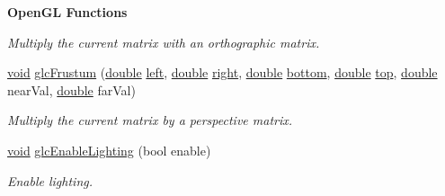 \begin{Indent}{\bf Open\-G\-L Functions}
\begin{DoxyCompactItemize}
\begin{DoxyCompactList}\small\item\em Multiply the current matrix with an orthographic matrix. \end{DoxyCompactList}\item 
\hyperlink{group___u_a_v_objects_plugin_ga444cf2ff3f0ecbe028adce838d373f5c}{void} \hyperlink{class_g_l_c___context_a8076a77848e9e2dbf734466c09b665fe}{glc\-Frustum} (\hyperlink{_super_l_u_support_8h_a8956b2b9f49bf918deed98379d159ca7}{double} \hyperlink{glext_8h_a85b8f6c07fbc1fb5d77c2ae090f21995}{left}, \hyperlink{_super_l_u_support_8h_a8956b2b9f49bf918deed98379d159ca7}{double} \hyperlink{glext_8h_a5ffadbbacc6b89cf6218bc43b384d3fe}{right}, \hyperlink{_super_l_u_support_8h_a8956b2b9f49bf918deed98379d159ca7}{double} \hyperlink{glext_8h_a95fc257e5ddf46f7db9d5e898cdf1991}{bottom}, \hyperlink{_super_l_u_support_8h_a8956b2b9f49bf918deed98379d159ca7}{double} \hyperlink{glext_8h_a5ab323daeacf8dfdb8f91132fecdca23}{top}, \hyperlink{_super_l_u_support_8h_a8956b2b9f49bf918deed98379d159ca7}{double} near\-Val, \hyperlink{_super_l_u_support_8h_a8956b2b9f49bf918deed98379d159ca7}{double} far\-Val)
\begin{DoxyCompactList}\small\item\em Multiply the current matrix by a perspective matrix. \end{DoxyCompactList}\item 
\hyperlink{group___u_a_v_objects_plugin_ga444cf2ff3f0ecbe028adce838d373f5c}{void} \hyperlink{class_g_l_c___context_abbe9b65bf4a83e973e6d2a6836b67188}{glc\-Enable\-Lighting} (bool enable)
\begin{DoxyCompactList}\small\item\em Enable lighting. \end{DoxyCompactList}\end{DoxyCompactItemize}
\end{Indent}
